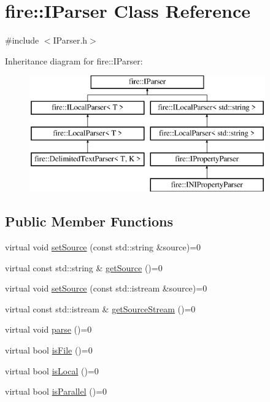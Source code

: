 \hypertarget{a00165}{}\section{fire\+:\+:I\+Parser Class Reference}
\label{a00165}


{\ttfamily \#include $<$I\+Parser.\+h$>$}

Inheritance diagram for fire\+:\+:I\+Parser\+:\begin{figure}[H]
\begin{center}
\leavevmode
\includegraphics[height=5.000000cm]{a00165}
\end{center}
\end{figure}
\subsection*{Public Member Functions}
\begin{DoxyCompactItemize}
\item 
virtual void \hyperlink{a00165_a0dbeff2b9bd8dbfb2aad7a424eef87d1}{set\+Source} (const std\+::string \&source)=0
\item 
virtual const std\+::string \& \hyperlink{a00165_ab55d2644dfa6d950d1f874e1e02df095}{get\+Source} ()=0
\item 
virtual void \hyperlink{a00165_a7748a633910e9bfc27411d6bd840496b}{set\+Source} (const std\+::istream \&source)=0
\item 
virtual const std\+::istream \& \hyperlink{a00165_ac94c7a288bf669322b93ba171c43f90e}{get\+Source\+Stream} ()=0
\item 
virtual void \hyperlink{a00165_af36ac6eedd8c27d2f418869193d7d03c}{parse} ()=0
\item 
virtual bool \hyperlink{a00165_a616c42c85d781c916e97f0ad8f1e9010}{is\+File} ()=0
\item 
virtual bool \hyperlink{a00165_a97b9e58493b3cadbc63e670b0b0e759f}{is\+Local} ()=0
\item 
virtual bool \hyperlink{a00165_a83d2882a466d694fb0aea3d846bcbed4}{is\+Parallel} ()=0
\end{DoxyCompactItemize}


